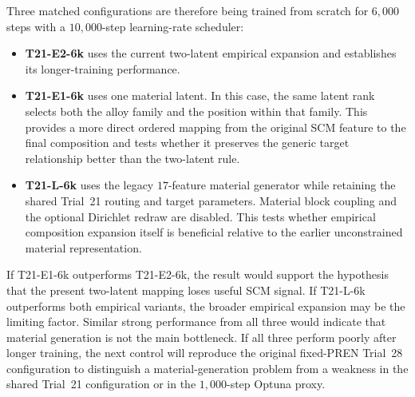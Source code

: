 \documentclass{article}
\begin{document}
Three matched configurations are therefore being trained from scratch for
\(6{,}000\) steps with a \(10{,}000\)-step learning-rate scheduler:

\begin{itemize}
    \item \textbf{T21-E2-6k} uses the current two-latent empirical expansion and
    establishes its longer-training performance.

    \item \textbf{T21-E1-6k} uses one material latent. In this case, the same
    latent rank selects both the alloy family and the position within that
    family. This provides a more direct ordered mapping from the original SCM
    feature to the final composition and tests whether it preserves the generic
    target relationship better than the two-latent rule.

    \item \textbf{T21-L-6k} uses the legacy \(17\)-feature material generator
    while retaining the shared Trial~21 routing and target parameters. Material
    block coupling and the optional Dirichlet redraw are disabled. This tests
    whether empirical composition expansion itself is beneficial relative to
    the earlier unconstrained material representation.
\end{itemize}

If T21-E1-6k outperforms T21-E2-6k, the result would support the hypothesis that
the present two-latent mapping loses useful SCM signal. If T21-L-6k outperforms
both empirical variants, the broader empirical expansion may be the limiting
factor. Similar strong performance from all three would indicate that material
generation is not the main bottleneck. If all three perform poorly after longer
training, the next control will reproduce the original fixed-PREN Trial~28
configuration to distinguish a material-generation problem from a weakness in
the shared Trial~21 configuration or in the \(1{,}000\)-step Optuna proxy.
\end{document}
